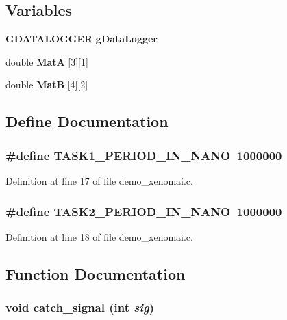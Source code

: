 \subsection*{Variables}
\begin{DoxyCompactItemize}
\item 
{\bf GDATALOGGER} {\bf gDataLogger}
\item 
double {\bf MatA} [3][1]
\item 
double {\bf MatB} [4][2]
\end{DoxyCompactItemize}


\subsection{Define Documentation}
\subsubsection[{TASK1\_\-PERIOD\_\-IN\_\-NANO}]{\setlength{\rightskip}{0pt plus 5cm}\#define TASK1\_\-PERIOD\_\-IN\_\-NANO~1000000}\label{demo__xenomai_8c_a502e8ff04fbdaca75759b6aa95a80260}


Definition at line 17 of file demo\_\-xenomai.c.
\subsubsection[{TASK2\_\-PERIOD\_\-IN\_\-NANO}]{\setlength{\rightskip}{0pt plus 5cm}\#define TASK2\_\-PERIOD\_\-IN\_\-NANO~1000000}\label{demo__xenomai_8c_a7ca9dde848cb8a9965f2f05c0e00fd1d}


Definition at line 18 of file demo\_\-xenomai.c.

\subsection{Function Documentation}
\subsubsection[{catch\_\-signal}]{\setlength{\rightskip}{0pt plus 5cm}void catch\_\-signal (int {\em sig})}\label{demo__xenomai_8c_af2dc378d0481adcc49b61efb98493a9b}


